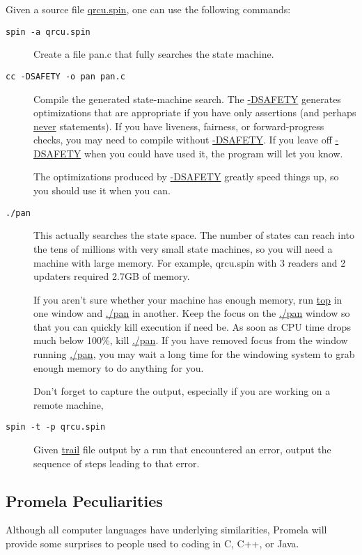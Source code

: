 Given a source file \url{qrcu.spin}, one can use the following commands:

\begin{description}
\item[{\tt spin -a qrcu.spin}]
	Create a file pan.c that fully searches the state machine.
\item[{\tt cc -DSAFETY -o pan pan.c}]
	Compile the generated state-machine search.  The \url{-DSAFETY}
	generates optimizations that are appropriate if you have only
	assertions (and perhaps \url{never} statements).  If you have
	liveness, fairness, or forward-progress checks, you may need
	to compile without \url{-DSAFETY}.  If you leave off \url{-DSAFETY}
	when you could have used it, the program will let you know.
	
	The optimizations produced by \url{-DSAFETY} greatly speed things
	up, so you should use it when you can.
\item[{\tt ./pan}]
	This actually searches the state space.  The number of states
	can reach into the tens of millions with very small state
	machines, so you will need a machine with large memory.
	For example, qrcu.spin with 3 readers and 2 updaters required
	2.7GB of memory.

	If you aren't sure whether your machine has enough memory,
	run \url{top} in one window and \url{./pan} in another.  Keep the
	focus on the \url{./pan} window so that you can quickly kill
	execution if need be.  As soon as CPU time drops much below
	100\%, kill \url{./pan}.  If you have removed focus from the
	window running \url{./pan}, you may wait a long time for the
	windowing system to grab enough memory to do anything for
	you.

	Don't forget to capture the output, especially
	if you are working on a remote machine,
\item[{\tt spin -t -p qrcu.spin}]
	Given \url{trail} file output by a run that encountered an
	error, output the sequence of steps leading to that error.
\end{description}

\subsection{Promela Peculiarities}
\label{app:formal:Promela Peculiarities}

Although all computer languages have underlying similarities,
Promela will provide some surprises to people used to coding in C,
C++, or Java.

